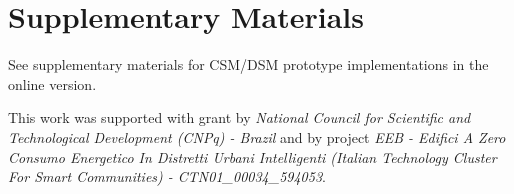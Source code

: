 \documentclass[format=acmsmall, review=false, screen=false]{acmart}
\begin{document}
	\section{Supplementary Materials}	
	
	\begin{printonly}
	  See supplementary materials for CSM/DSM prototype implementations in the online version.
	\end{printonly}
	
	\begin{screenonly}
	
	
	  
	\end{screenonly}
	
	\begin{acks}
	
	This work was supported with grant by \textit{National Council for Scientific and Technological Development (CNPq) - Brazil} and by project \textit{EEB - Edifici A Zero Consumo Energetico In Distretti Urbani Intelligenti (Italian Technology Cluster For Smart Communities) - CTN01\_00034\_594053}.
	
	\end{acks}
	
	
	
	
\end{document}
